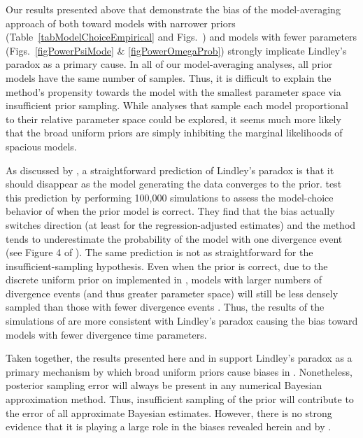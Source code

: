 \documentclass[letterpaper,12pt]{article}
\begin{document}
\begin{linenumbers}
Our results presented above that demonstrate the bias of the model-averaging
approach of \citet{Hickerson2013} both toward models with narrower \divt{}
priors (Table~\ref{tabModelChoiceEmpirical} and
Figs.~)
and models with fewer \divt{} parameters (Figs.~\ref{figPowerPsiMode} \&
\ref{figPowerOmegaProb}) strongly implicate Lindley's paradox as a primary
cause.
In all of our model-averaging analyses, all prior models have the same number
of samples.
Thus, it is difficult to explain the method's propensity towards the model with
the smallest parameter space via insufficient prior sampling.
While analyses that sample each model proportional to their relative parameter
space could be explored, it seems much more likely that the broad uniform
priors are simply inhibiting the marginal likelihoods of spacious models.

As discussed by \citet{Oaks2012}, a straightforward prediction of Lindley's
paradox is that it should disappear as the model generating the data converges
to the prior.
\citet{Oaks2012} test this prediction by performing 100,000 simulations to
assess the model-choice behavior of \msb when the prior model is correct.
They find that the bias actually switches direction (at least for the
regression-adjusted estimates) and the method tends to underestimate the
probability of the model with one divergence event (see Figure 4 of
\citet{Oaks2012}).
The same prediction is not as straightforward for the insufficient-sampling
hypothesis.
Even when the prior is correct, due to the discrete uniform prior on
\numt{} implemented in \msb, models with larger numbers of divergence
events (and thus greater parameter space) will still be less densely
sampled than those with fewer divergence events \citep{Oaks2012}.
Thus, the results of the simulations of \citet{Oaks2012} are more consistent
with Lindley's paradox causing the bias toward models with fewer divergence
time parameters.

Taken together, the results presented here and in \citet{Oaks2012} support
Lindley's paradox as a primary mechanism by which broad uniform priors
cause biases in \msb.
Nonetheless, posterior sampling error will always be present in any numerical
Bayesian approximation method.
Thus, insufficient sampling of the prior will contribute to the error of all
approximate Bayesian estimates.
However, there is no strong evidence that it is playing a large role in
the biases revealed herein and by \citet{Oaks2012}.





\end{linenumbers}
\end{document}
